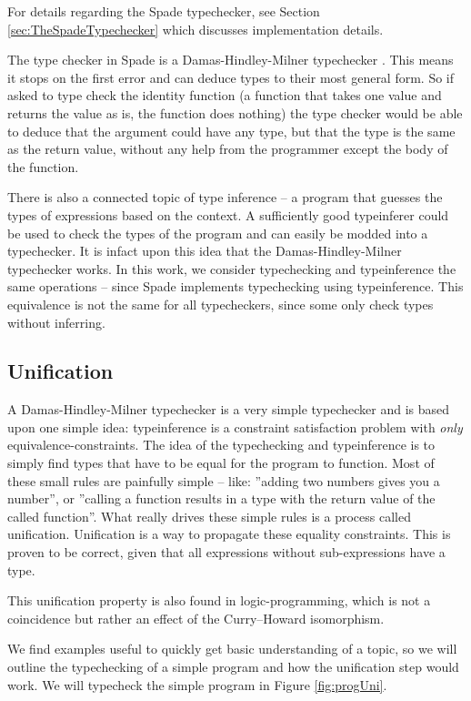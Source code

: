 For details regarding the Spade typechecker, see Section \ref{sec:TheSpadeTypechecker} which discusses implementation details.

The type checker in Spade is a Damas-Hindley-Milner typechecker \cite{src:DamasHindleyMilner}. This means it stops on the first error and can deduce types to their most general form. So if asked to type check the identity function (a function that takes one value and returns the value as is, the function does nothing) the type checker would be able to deduce that the argument could have any type, but that the type is the same as the return value, without any help from the programmer except the body of the function. \cite{src:DamasHindleyMilner}

There is also a connected topic of type inference -- a program that guesses the types of expressions based on the context. A sufficiently good typeinferer could be used to check the types of the program and can easily be modded into a typechecker. It is infact upon this idea that the Damas-Hindley-Milner typechecker works. In this work, we consider typechecking and typeinference the same operations -- since Spade implements typechecking using typeinference. This equivalence is not the same for all typecheckers, since some only check types without inferring.

\subsection{Unification}
\label{sec:Unification}
A Damas-Hindley-Milner typechecker is a very simple typechecker and is based upon one simple idea: typeinference is a constraint satisfaction problem with \textit{only} equivalence-constraints. The idea of the typechecking and typeinference is to simply find types that have to be equal for the program to function. Most of these small rules are painfully simple -- like: ''adding two numbers gives you a number'', or ''calling a function results in a type with the return value of the called function''. What really drives these simple rules is a process called unification. Unification is a way to propagate these equality constraints. This is proven to be correct, given that all expressions without sub-expressions have a type.

This unification property is also found in logic-programming, which is not a coincidence but rather an effect of the Curry–Howard isomorphism. \cite{src:curryHowardIso}

We find examples useful to quickly get basic understanding of a topic, so we will outline the typechecking of a simple program and how the unification step would work. We will typecheck the simple program in Figure \ref{fig:progUni}.

